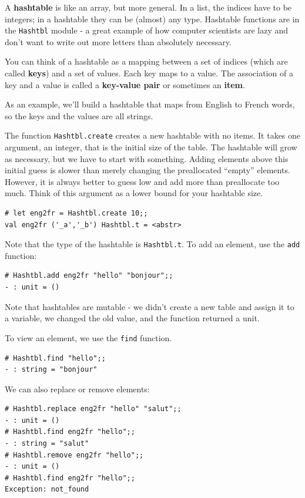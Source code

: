 \documentclass[10pt]{book}
\begin{document}
A {\bf hashtable} is like an array, but more general.  In a list,
the indices have to be integers; in a hashtable they can
be (almost) any type. Hashtable functions are in the {\tt Hashtbl} 
module - a great example of how computer scientists are lazy and don't 
want to write out more letters than absolutely necessary.

You can think of a hashtable as a mapping between a set of indices
(which are called {\bf keys}) and a set of values.  Each key maps to a
value.  The association of a key and a value is called a {\bf
  key-value pair} or sometimes an {\bf item}.

As an example, we'll build a hashtable that maps from English
to French words, so the keys and the values are all strings.

The function {\tt Hashtbl.create} creates a new hashtable with no items.
It takes one argument, an integer, that is the initial size of the table.
The hashtable will grow as necessary, but we have to start with something.
Adding elements above this initial guess is slower than merely
changing the preallocated ``empty'' elements. However, it is always better
to guess low and add more than preallocate too much. Think of this argument 
as a lower bound for your hashtable size.

\beforeverb
\begin{verbatim}
# let eng2fr = Hashtbl.create 10;;
val eng2fr ('_a','_b') Hashtbl.t = <abstr>
\end{verbatim}
\afterverb

Note that the type of the hashtable is {\tt Hashtbl.t}. To add an element, use the 
{\tt add} function:

\beforeverb
\begin{verbatim}
# Hashtbl.add eng2fr "hello" "bonjour";;
- : unit = ()
\end{verbatim}
\afterverb

Note that hashtables are mutable - we didn't create a new table and assign it to 
a variable, we changed the old value, and the function returned a unit.

To view an element, we use the {\tt find} function.

\beforeverb
\begin{verbatim}
# Hashtbl.find "hello";;
- : string = "bonjour"
\end{verbatim}
\afterverb

We can also replace or remove elements:

\beforeverb
\begin{verbatim}
# Hashtbl.replace eng2fr "hello" "salut";;
- : unit = ()
# Hashtbl.find eng2fr "hello";;
- : string = "salut"
# Hashtbl.remove eng2fr "hello";;
- : unit = ()
# Hashtbl.find eng2fr "hello";;
Exception: not_found
\end{verbatim}
\afterverb
\end{document}
